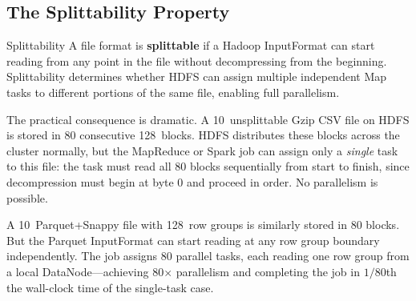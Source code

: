 \subsection{The Splittability Property}
\label{subsec:splittability}

\begin{defbox}{Splittability}
A file format is \textbf{splittable} if a Hadoop InputFormat can start
reading from any point in the file without decompressing from the
beginning. Splittability determines whether HDFS can assign multiple
independent Map tasks to different portions of the same file, enabling
full parallelism.
\end{defbox}

The practical consequence is dramatic. A 10\GB\ unsplittable Gzip CSV
file on HDFS is stored in 80 consecutive 128\MB\ blocks. HDFS distributes
these blocks across the cluster normally, but the MapReduce or Spark job
can assign only a \emph{single} task to this file: the task must read
all 80 blocks sequentially from start to finish, since decompression
must begin at byte 0 and proceed in order. No parallelism is possible.

A 10\GB\ Parquet+Snappy file with 128\MB\ row groups is similarly
stored in 80 blocks. But the Parquet InputFormat can start reading at
any row group boundary independently. The job assigns 80 parallel tasks,
each reading one row group from a local DataNode---achieving 80$\times$
parallelism and completing the job in $1/80$th the wall-clock time of
the single-task case.

